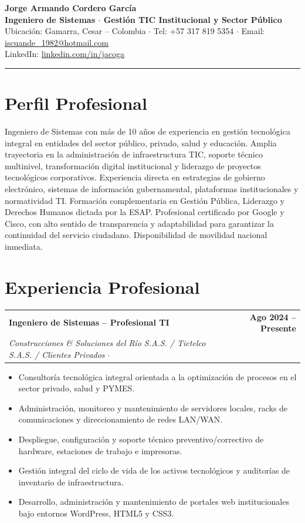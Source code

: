 \documentclass[10pt, letterpaper]{article}
\makeatletter
\newcommand{\cvheader}[5]{%
  \begin{center}
    {\LARGE\bfseries\color{primary} #1}\\[4pt]
    {\large\bfseries\color{accent} #2}\\[6pt]
    {\small\color{darkgray}
      Ubicación: #3 \quad $\cdot$ \quad
      Tel: #4 \quad $\cdot$ \quad
      Email: \href{mailto:#5}{#5}
    }\\[2pt]
    {\small\color{darkgray}
      LinkedIn: \href{https://linkedin.com/in/jacoga}{linkedin.com/in/jacoga}
    }
  \end{center}
  \vspace{-2pt}
  \textcolor{rulecol}{\rule{\linewidth}{1.5pt}}
  \vspace{2pt}
}
\newcommand{\cventry}[5]{%
  \noindent
  \begin{tabularx}{\linewidth}{@{}X r@{}}
    {\bfseries\color{primary} #1} & {\small\color{medgray}\bfseries #2} \\
    {\small\color{accent}\itshape #3} \quad $\cdot$ \quad {\small\color{darkgray} #4} & \\
  \end{tabularx}
  \vspace{-2pt}
  #5
  \vspace{4pt}
}
\makeatother
\begin{document}

\cvheader
  {Jorge Armando Cordero García}
  {Ingeniero de Sistemas $\cdot$ Gestión TIC Institucional y Sector Público}
  {Gamarra, Cesar -- Colombia}
  {+57 317 819 5354}
  {iscuande\_1982@hotmail.com}

\section*{Perfil Profesional}
\vspace{-2pt}
Ingeniero de Sistemas con más de 10 años de experiencia en gestión tecnológica integral en entidades del sector público, privado, salud y educación. Amplia trayectoria en la administración de infraestructura TIC, soporte técnico multinivel, transformación digital institucional y liderazgo de proyectos tecnológicos corporativos. Experiencia directa en estrategias de gobierno electrónico, sistemas de información gubernamental, plataformas institucionales y normatividad TI. Formación complementaria en Gestión Pública, Liderazgo y Derechos Humanos dictada por la ESAP. Profesional certificado por Google y Cisco, con alto sentido de transparencia y adaptabilidad para garantizar la continuidad del servicio ciudadano. Disponibilidad de movilidad nacional inmediata.

\section*{Experiencia Profesional}
\vspace{-2pt}

\cventry
  {Ingeniero de Sistemas – Profesional TI}
  {Ago 2024 -- Presente}
  {Construcciones \& Soluciones del Río S.A.S. / Tictelco S.A.S. / Clientes Privados}
  {Aguachica, Cesar -- Híbrida}
  {
    \begin{itemize}
      \item Consultoría tecnológica integral orientada a la optimización de procesos en el sector privado, salud y PYMES.
      \item Administración, monitoreo y mantenimiento de servidores locales, racks de comunicaciones y direccionamiento de redes LAN/WAN.
      \item Despliegue, configuración y soporte técnico preventivo/correctivo de hardware, estaciones de trabajo e impresoras.
      \item Gestión integral del ciclo de vida de los activos tecnológicos y auditorías de inventario de infraestructura.
      \item Desarrollo, administración y mantenimiento de portales web institucionales bajo entornos WordPress, HTML5 y CSS3.
    \end{itemize}
  }
\end{document}

